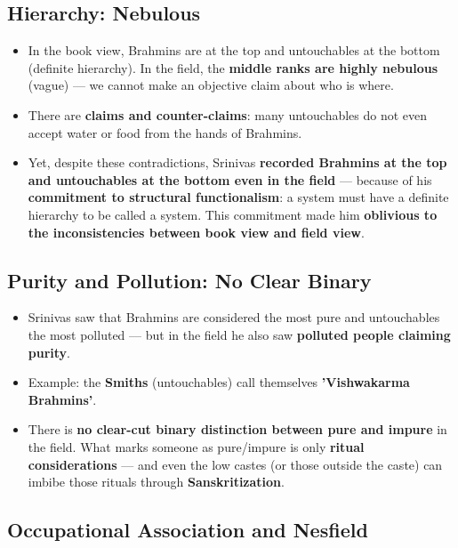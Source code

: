\subsection{Hierarchy: Nebulous}

\begin{KeyConcept}
\begin{itemize}
\item In the book view, Brahmins are at the top and untouchables at the bottom (definite hierarchy). In the field, the \textbf{middle ranks are highly nebulous} (vague) --- we cannot make an objective claim about who is where.
\item There are \textbf{claims and counter-claims}: many untouchables do not even accept water or food from the hands of Brahmins.
\item Yet, despite these contradictions, Srinivas \textbf{recorded Brahmins at the top and untouchables at the bottom even in the field} --- because of his \textbf{commitment to structural functionalism}: a system must have a definite hierarchy to be called a system. This commitment made him \textbf{oblivious to the inconsistencies between book view and field view}.
\end{itemize}
\end{KeyConcept}

\subsection{Purity and Pollution: No Clear Binary}

\begin{KeyConcept}
\begin{itemize}
\item Srinivas saw that Brahmins are considered the most pure and untouchables the most polluted --- but in the field he also saw \textbf{polluted people claiming purity}.
\item Example: the \textbf{Smiths} (untouchables) call themselves \textbf{'Vishwakarma Brahmins'}.
\item There is \textbf{no clear-cut binary distinction between pure and impure} in the field. What marks someone as pure/impure is only \textbf{ritual considerations} --- and even the low castes (or those outside the caste) can imbibe those rituals through \textbf{Sanskritization}.
\end{itemize}
\end{KeyConcept}

\subsection{Occupational Association and Nesfield}

